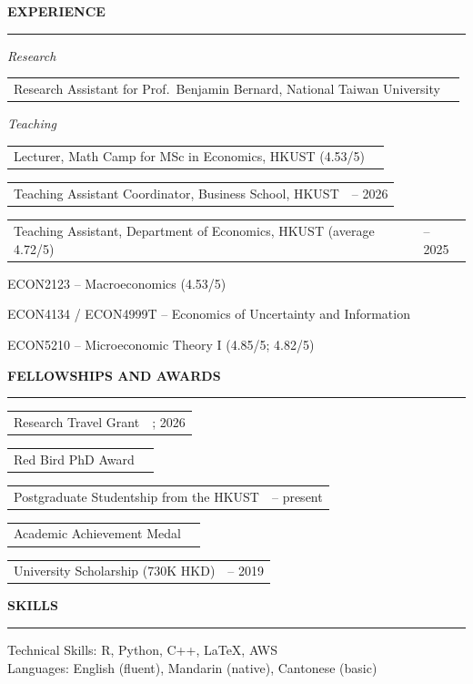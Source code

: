 \documentclass[11pt,letterpaper]{article}
\makeatletter
\newlength{\cvdatecol}
\newcommand{\sectionheader}[1]{%
  \vspace{0.45em}
  {\large\bfseries #1}\\[-0.15em]
  \rule{\textwidth}{0.4pt}\par
  \vspace{0.2em}
}
\newcommand{\cvline}[3][0em]{%
  \par\nobreak
  \noindent\hspace*{#1}%
  \begin{tabularx}{\dimexpr\textwidth-#1\relax}{@{}X@{\hspace{0.75em}}>{\raggedleft\arraybackslash}p{\cvdatecol}@{}}
  #2 & #3 \\
  \end{tabularx}%
}
\newcommand{\courseline}[1]{%
  \par\addvspace{0.22em}%
  \noindent\hspace*{3.2em}#1\par
}
\makeatother
\begin{document}
\sectionheader{EXPERIENCE}
{
\textit{Research}\\[-0.5em]
\cvline[1.5em]{Research Assistant for Prof.\ Benjamin Bernard, National Taiwan University}{2020}

\vspace{-0.1em}
\textit{Teaching}\\[-0.5em]
\cvline[1.5em]{Lecturer, Math Camp for MSc in Economics, HKUST (4.53/5)}{2026}
\vspace{-0.12em}
\cvline[1.5em]{Teaching Assistant Coordinator, Business School, HKUST}{2025 -- 2026}
\vspace{-0.12em}
\cvline[1.5em]{Teaching Assistant, Department of Economics, HKUST (average 4.72/5)}{2020 -- 2025}
\vspace{0.08em}
\courseline{ECON2123 -- Macroeconomics (4.53/5)}
\courseline{ECON4134 / ECON4999T -- Economics of Uncertainty and Information}
\courseline{ECON5210 -- Microeconomic Theory I (4.85/5; 4.82/5)}
}

\sectionheader{FELLOWSHIPS AND AWARDS}
{
\cvline[1.5em]{Research Travel Grant}{2023; 2026}
\vspace{-0.12em}
\cvline[1.5em]{Red Bird PhD Award}{2022}
\vspace{-0.12em}
\cvline[1.5em]{Postgraduate Studentship from the HKUST}{2020 -- present}
\vspace{-0.12em}
\cvline[1.5em]{Academic Achievement Medal}{2019}
\vspace{-0.12em}
\cvline[1.5em]{University Scholarship (730K HKD)}{2015 -- 2019}
}

\sectionheader{SKILLS}
Technical Skills: R, Python, C++, \LaTeX, AWS\\
Languages: English (fluent), Mandarin (native), Cantonese (basic)
\end{document}
